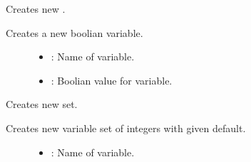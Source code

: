 \documentclass[letterpaper,10pt,english]{sphinxmanual}
\begin{document}
\begin{fulllineitems}
\begin{fulllineitems}
\begin{description}
\begin{itemize}
\end{itemize}

\end{description}


\end{fulllineitems}


\begin{fulllineitems}
\label{\detokenize{index:_CPPv2N7ostendo3Var3VarENSt6stringEb}}%
\pysigstartmultiline
{}\label{\detokenize{index:Pessumstructostendo_1_1Var_1a2a1b2e8999f04386e78330662734fc52}}%
\pysigstopmultiline
Creates new {\hyperref[\detokenize{index:Pessumstructostendo_1_1Var}]{}}. 

Creates a new boolian variable. \begin{description}
\item[{}] \leavevmode\begin{itemize}
\item {} 
: Name of variable. 

\item {} 
: Boolian value for variable. 

\end{itemize}

\end{description}


\end{fulllineitems}


\begin{fulllineitems}
\label{\detokenize{index:_CPPv2N7ostendo3Var3VarENSt6stringENSt6vectorIiEEi}}%
\pysigstartmultiline
{}\label{\detokenize{index:Pessumstructostendo_1_1Var_1add66e15a270e6dc6dbdc81e707ebae2a}}%
\pysigstopmultiline
Creates new {\hyperref[\detokenize{index:Pessumstructostendo_1_1Var}]{}} set. 

Creates new variable set of integers with given default. \begin{description}
\item[{}] \leavevmode\begin{itemize}
\item {} 
: Name of variable. 


\end{itemize}
\end{description}
\end{fulllineitems}
\end{fulllineitems}
\end{document}
